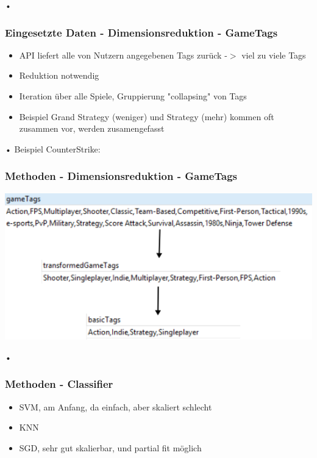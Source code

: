 \documentclass[12pt]{beamer}
\begin{document}
\begin{frame}{•}
	\frametitle{Eingesetzte Daten - Dimensionsreduktion - GameTags}
	\begin{itemize}
		\item API liefert alle von Nutzern angegebenen Tags zurück -$>$ viel zu viele Tags
		\item Reduktion notwendig
		\item Iteration über alle Spiele, Gruppierung "collapsing" von Tags
		\item Beispiel Grand Strategy (weniger) und Strategy (mehr) kommen oft zusammen vor, werden zusamengefasst
	\end{itemize}
	
\end{frame}

\begin{frame}{•}
	Beispiel CounterStrike: \newline \newblock
	\frametitle{Methoden - Dimensionsreduktion - GameTags}
	\includegraphics[width=1\textwidth]{img/cs_gametag_reduction.png}
\end{frame}	





\begin{frame}{•}
\frametitle{Methoden - Classifier}
\begin{itemize}
\item SVM, am Anfang, da einfach, aber skaliert schlecht
\item KNN
\item SGD, sehr gut skalierbar, und partial fit möglich
\end{itemize}
\end{frame}
\end{document}
